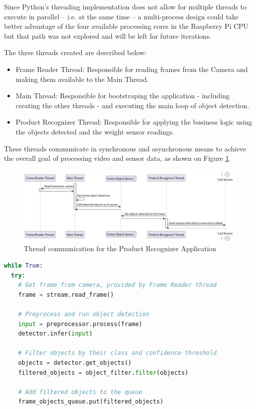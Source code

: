 \documentclass[openright]{normas-utf-tex} %
\begin{document}
Since Python's threading implementation does not allow for multiple threads to
execute in parallel -- i.e. at the same time -- a multi-process design could take
better advantage of the four available processing cores in the Raspberry Pi CPU
but that path was not explored and will be left for future iterations.

The three threads created are described below:
\begin{itemize}
    \item Frame Reader Thread: Responsible for reading frames from the Camera and making them available to the Main Thread.
    \item Main Thread: Responsible for bootstraping the application - including creating the other threads - and executing the main loop of
        object detection.
    \item Product Recognizer Thread: Responsible for applying the business logic using the objects detected and the weight sensor readings.
\end{itemize}

These threads communicate in synchronous and asynchronous means to achieve the overall goal of processing video and sensor data, as shown on Figure \ref{fig:threads}.

\begin{figure}[H]
	\centering
	\includegraphics[width=1\textwidth]{./images/Product Recognizer Thread communication.png}
	\caption[Thread communication for the Product Recognizer Appplication]{Thread communication for the Product Recognizer Application}
	\label{fig:threads}
\end{figure}

\begin{lstlisting}[language=Python,caption={Loop of the Main Thread. Some details were ommitted for the sake of brevity},label={lst:main}]
while True:
  try:
    # Get frame from camera, provided by Frame Reader thread
    frame = stream.read_frame()

    # Preprocess and run object detection
    input = preprocessor.process(frame)
    detector.infer(input)

    # Filter objects by their class and confidence threshold
    objects = detector.get_objects()
    filtered_objects = object_filter.filter(objects)

    # Add filtered objects to the queue
    frame_objects_queue.put(filtered_objects)
\end{lstlisting}
\end{document}
